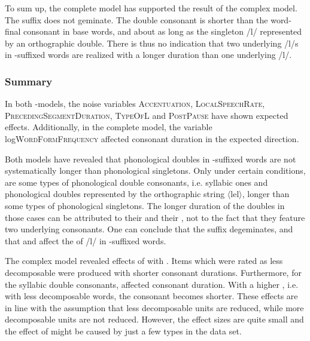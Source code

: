 To sum up, the complete model has supported the result of the complex model. The suffix  does not geminate. The double consonant is shorter than the word-final consonant in base words, and about as long as the singleton /l/ represented by an orthographic double. There is thus no indication that two underlying /l/s in -suffixed words are realized with a longer duration than one underlying /l/.




\subsubsection{Summary} \label{ly experiment summary}\largerpage[-1]

In both -models, the noise variables \textsc{Accentuation}, \textsc{LocalSpeechRate}, \textsc{PrecedingSegmentDuration}, \textsc{TypeOfL} and \textsc{PostPause} have shown expected effects. Additionally, in the complete model, the variable log\textsc{WordFormFrequency} affected consonant duration in the expected direction.

Both models have revealed that phonological doubles in -suffixed words are not systematically longer than phonological singletons. Only under certain conditions, are some types of phonological double consonants, i.e. syllabic ones and phonological doubles represented by the orthographic string $\langle$lel$\rangle$, longer than some types of phonological singletons. The longer duration of the doubles in those cases can be attributed to their  and their , not to the fact that they feature two underlying consonants. 
One can conclude that the suffix  degeminates, and that  and  affect the  of /l/ in -suffixed words. 

The complex model revealed effects of  with . Items which were rated as less decomposable were produced with shorter consonant durations. Furthermore, for the syllabic double consonants,  affected consonant duration. With a higher , i.e. with less decomposable words, the consonant becomes shorter. 
These effects are in line with the assumption that less decomposable units are reduced, while more decomposable units are not reduced. However, the effect sizes are quite small and the effect of  might be caused by just a few types in the data set. 

